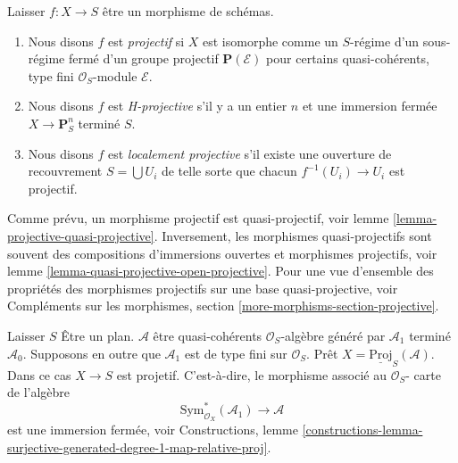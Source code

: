 \begin{definition}

\label{definition-projective}

Laisser $f : X \to S$ être un morphisme de schémas.

\begin{enumerate}

\item Nous disons $f$ est {\it projectif} si $X$ est isomorphe comme un $S$-régime d'un sous-régime fermé d'un groupe projectif $\mathbf{P}(\mathcal{E})$
pour certains quasi-cohérents, type fini $\mathcal{O}_S$-module $\mathcal{E}$.
\item Nous disons $f$ est {\it H-projective} s'il y a un entier $n$ et une immersion fermée $X \to \mathbf{P}^n_S$ terminé $S$.
\item Nous disons $f$ est {\it localement projective} s'il existe une ouverture de recouvrement $S = \bigcup U_i$ de telle sorte que chacun $f^{-1}(U_i) \to U_i$ est projectif.

\end{enumerate}

\end{definition}

\noindent
Comme prévu, un morphisme projectif est quasi-projectif, voir lemme \ref{lemma-projective-quasi-projective}. Inversement, les morphismes quasi-projectifs sont souvent des compositions d'immersions ouvertes et morphismes projectifs, voir lemme \ref{lemma-quasi-projective-open-projective}. Pour une vue d'ensemble des propriétés des morphismes projectifs sur une base quasi-projective, voir Compléments sur les morphismes, section \ref{more-morphisms-section-projective}.

\begin{example}

\label{example-projective}

Laisser $S$ Être un plan. $\mathcal{A}$ être quasi-cohérents
$\mathcal{O}_S$-algèbre généré par $\mathcal{A}_1$ terminé $\mathcal{A}_0$. Supposons en outre que $\mathcal{A}_1$ est de type fini sur
$\mathcal{O}_S$. Prêt $X = \underline{\text{Proj}}_S(\mathcal{A})$. Dans ce cas $X \to S$ est projetif. C'est-à-dire, le morphisme associé au $\mathcal{O}_S$- carte de l'algèbre
$$
\text{Sym}_{\mathcal{O}_X}^*(\mathcal{A}_1)
\longrightarrow
\mathcal{A}
$$
est une immersion fermée, voir Constructions, lemme
\ref{constructions-lemma-surjective-generated-degree-1-map-relative-proj}.

\end{example}
 
